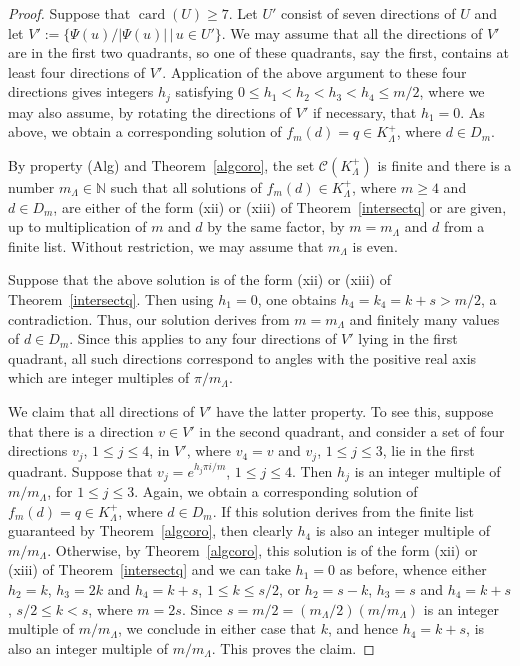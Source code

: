 \documentclass[a4paper]{amsart}
\theoremstyle{definition}
\numberwithin{equation}{section}
\numberwithin{theorem}{section}
\begin{document}
\begin{proof}
Suppose that $\operatorname{card}(U)\geq 7$. Let
$U'$ consist of seven directions of $U$ and let $V':= \{
\Psi(u)/| \Psi(u)|\, |\, u\in U' \}$. We may assume
that all the directions of $V'$ are in the first two quadrants, so one
of these quadrants, say the first, contains at least four directions
of $V'$. Application of the above argument to these four directions gives integers $h_j$ satisfying $0\leq h_1<h_2<h_3<h_4\leq m/2$, where we may also assume, by rotating the directions of $V'$ if
necessary, that $h_1=0$. As above, we obtain a corresponding solution of
$f_m(d)=q\in K_{\varLambda}^+$, where $d\in D_m$. 

By property (Alg) and Theorem~\ref{algcoro}, the set $\mathcal{C}(K_{\varLambda}^+)$
is finite and there is a number
$m_{\varLambda}\in{\mathbb{N}}$ such that all solutions of $f_{m}(d)\in K_{\varLambda}^+$, where $m\geq 4$ and
$d\in D_{m}$, are either of the form
(xii) or (xiii) of Theorem~\ref{intersectq} or are  given, up to multiplication of $m$
and $d$ by the same factor, by $m=m_{\varLambda}$ and $d$
from a finite list. Without restriction, we may assume that $m_{\varLambda}$ is even. 

Suppose that the above solution is of the form
(xii) or (xiii) of Theorem~\ref{intersectq}. Then using $h_1=0$, one
obtains $h_4=k_4=k+s>m/2$, a contradiction. Thus, our solution derives from
$m=m_{\varLambda}$ and finitely many values of $d\in D_m$. Since
this applies to any four directions of $V'$ lying in the first
quadrant, all such directions correspond to angles with the positive
real axis which are integer multiples of $\pi/m_{\varLambda}$.

We claim that all directions of $V'$ have the latter property. To see
this, suppose that there is a direction $v\in V'$ in the second
quadrant, and consider a set of four directions $v_j$, $1\leq j\leq
4$, in $V'$, where $v_4=v$ and $v_j$, $1\leq j\leq
3$, lie in the first quadrant. Suppose that $v_j=e^{h_j\pi i/m}$, $1\leq
j\leq 4$. Then $h_j$ is an integer multiple of $m/m_{\varLambda}$, for $1\leq j\leq
3$. Again, we obtain a corresponding solution of
$f_m(d)=q\in K_{\varLambda}^+$, where $d\in D_m$. If this solution derives
from the finite list guaranteed by Theorem~\ref{algcoro}, 
then clearly $h_4$ is also an integer multiple of
$m/m_{\varLambda}$. Otherwise, by Theorem~\ref{algcoro}, this
solution is of the form (xii) or (xiii) of Theorem~\ref{intersectq} and we
can take $h_1=0$ as before, whence either $h_2=k$, $h_3=2k$ and
$h_4=k+s$, $1\leq k\leq s/2$, or $h_2=s-k$, $h_3=s$ and
$h_4=k+s$, $s/2\leq k< s$, where $m=2s$. Since
$s=m/2=(m_{\varLambda}/2)(m/m_{\varLambda})$ is an integer 
multiple of $m/m_{\varLambda}$, we conclude in either case that $k$, and hence
$h_4=k+s$, is also an integer multiple of $m/m_{\varLambda}$. This
proves the claim.


\end{proof}
\end{document}
